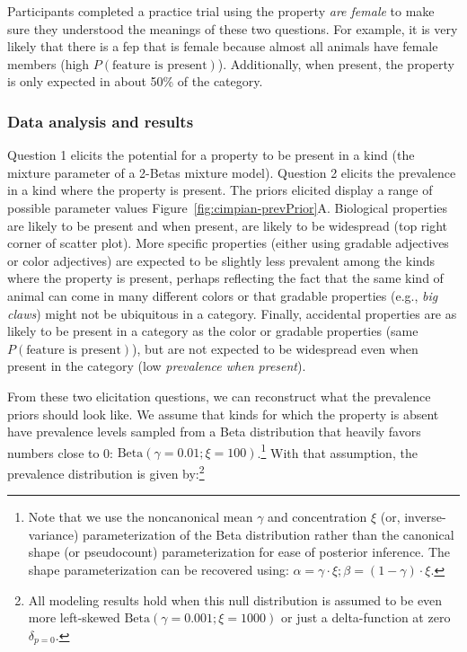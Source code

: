 \documentclass[floatsintext,doc]{apa6}
\theoremstyle{definition}
\theoremstyle{definition}
\theoremstyle{definition}
\theoremstyle{remark}
\begin{document}
Participants completed a practice trial using the property \emph{are
female} to make sure they understood the meanings of these two
questions. For example, it is very likely that there is a fep that is
female because almost all animals have female members (high
\(P(\text{feature is present})\)). Additionally, when present, the
property is only expected in about 50\% of the category.

\subsubsection{Data analysis and
results}\label{data-analysis-and-results}

Question 1 elicits the potential for a property to be present in a kind
(the mixture parameter of a 2-Betas mixture model). Question 2 elicits
the prevalence in a kind where the property is present. The priors
elicited display a range of possible parameter values
Figure~\ref{fig:cimpian-prevPrior}A. Biological properties are likely to
be present and when present, are likely to be widespread (top right
corner of scatter plot). More specific properties (either using gradable
adjectives or color adjectives) are expected to be slightly less
prevalent among the kinds where the property is present, perhaps
reflecting the fact that the same kind of animal can come in many
different colors or that gradable properties (e.g., \emph{big claws})
might not be ubiquitous in a category. Finally, accidental properties
are as likely to be present in a category as the color or gradable
properties (same \(P(\text{feature is present})\)), but are not expected
to be widespread even when present in the category (low \emph{prevalence
when present}).

From these two elicitation questions, we can reconstruct what the
prevalence priors should look like. We assume that kinds for which the
property is absent have prevalence levels sampled from a Beta
distribution that heavily favors numbers close to 0:
\(\text{Beta}(\gamma = 0.01; \xi = 100)\).\footnote{Note that we use the
  noncanonical mean \(\gamma\) and concentration \(\xi\) (or,
  inverse-variance) parameterization of the Beta distribution rather
  than the canonical shape (or pseudocount) parameterization for ease of
  posterior inference. The shape parameterization can be recovered
  using: \(\alpha = \gamma \cdot \xi; \beta = (1 - \gamma) \cdot \xi\).}
With that assumption, the prevalence distribution is given by:\footnote{All
  modeling results hold when this null distribution is assumed to be
  even more left-skewed \(\text{Beta}(\gamma = 0.001; \xi = 1000)\) or
  just a delta-function at zero \(\delta_{p=0}\).}
\end{document}
